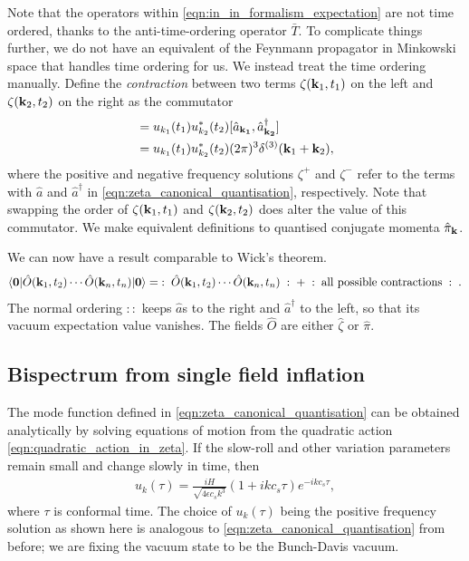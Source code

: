 Note that the operators within \eqref{eqn:in_in_formalism_expectation} are not time ordered, thanks to the anti-time-ordering operator $\bar{T}$. To complicate things further, we do not have an equivalent of the Feynmann propagator in Minkowski space that handles time ordering for us. We instead treat the time ordering manually. Define the \textit{contraction} between two terms $\zeta(\mathbf{k}_1,t_1)$ on the left and $\zeta(\mathbf{k}_2,t_2)$ on the right as the commutator
\begin{align}
	[ \zeta^+(\vv{k}_1,t_1) , \zeta^-(\vv{k}_2,t_2) ] &= u_{k_1}(t_1) u^*_{k_2}(t_2) [ \hat{a}_{\vv{k_1}}, \hat{a}_{\vv{k_2}}^\dagger] \\ &= u_{k_1}(t_1) u^*_{k_2}(t_2) (2\pi)^3 \delta^{(3)} (\vv{k}_1 + \vv{k}_2), 
\end{align}
where the positive and negative frequency solutions $\zeta^+$ and $\zeta^-$ refer to the terms with $\hat{a}$ and $\hat{a}^\dagger$ in \eqref{eqn:zeta_canonical_quantisation}, respectively. Note that swapping the order of $\zeta(\mathbf{k}_1,t_1)$ and $\zeta(\mathbf{k}_2,t_2)$ does alter the value of this commutator. We make equivalent definitions to quantised conjugate momenta $\hat{\pi}_\mathbf{k}$.

We can now have a result comparable to Wick's theorem.
\begin{align}
	\langle\mathbf{0}| \hat{O}(\mathbf{k}_1,t_2) \cdots \hat{O}(\mathbf{k}_n,t_n) |\mathbf{0}\rangle = \;:\; \hat{O}(\mathbf{k}_1,t_2)  \cdots \hat{O}(\mathbf{k}_n,t_n) \;:\; + \;:\;\text{all possible contractions}\;:\;. \label{eqn:in_in_Wicks_theorem}
\end{align}
The normal ordering $::$ keeps $\hat{a}$s to the right and $\hat{a}^\dagger$ to the left, so that its vacuum expectation value vanishes. The fields $\hat{O}$ are either $\hat{\zeta}$ or $\hat{\pi}$. 

\subsection{Bispectrum from single field inflation} \label{section:bispectrum_from_single_field_inflation}

The mode function defined in \eqref{eqn:zeta_canonical_quantisation} can be obtained analytically by solving equations of motion from the quadratic action \eqref{eqn:quadratic_action_in_zeta}. If the slow-roll and other variation parameters remain small and change slowly in time, then
\begin{align}
	u_k(\tau) = \frac{iH}{\sqrt{4\epsilon c_s k^3}} (1 + ikc_s \tau) e^{-ikc_s \tau},
\end{align}
where $\tau$ is conformal time. The choice of $u_k(\tau)$ being the positive frequency solution as shown here is analogous to \eqref{eqn:zeta_canonical_quantisation} from before; we are fixing the vacuum state to be the Bunch-Davis vacuum.

